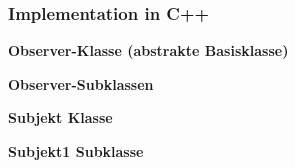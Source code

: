 \subsubsection{Implementation in C++}


\begin{outline}
    \1 \textbf{Observer-Klasse (abstrakte Basisklasse)}

    \1 \textbf{Observer-Subklassen}

    \1 \textbf{Subjekt Klasse}

    \1 \textbf{Subjekt1 Subklasse}
\end{outline}



